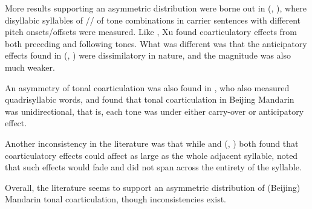 \documentclass[12pt]{report}
\newcommand{\tip}{\textipa}
\begin{document}
\begin{CJK}{UTF8}{bsmi}
More results supporting an asymmetric distribution were borne out in \citeauthor{Xu1994a} (\citeyear{Xu1994a}, \citeyear{Xu1997}), where disyllabic syllables of /\tip{ma.ma}/ of tone combinations in carrier sentences with different pitch onsets/offsets were measured. Like \cite{Shen1990}, Xu found coarticulatory effects from both preceding and following tones. What was different was that the anticipatory effects found in \citeauthor{Xu1994a} (\citeyear{Xu1994a}, \citeyear{Xu1997}) were dissimilatory in nature, and the magnitude was also much weaker.

An asymmetry of tonal coarticulation was also found in \cite{LinYan1991}, who also measured quadrisyllabic words, and found that tonal coarticulation in Beijing Mandarin was unidirectional, that is, each tone was under either carry-over or anticipatory effect.

Another inconsistency in the literature was that while \cite{Shen1990} and \citeauthor{Xu1994a} (\citeyear{Xu1994a}, \citeyear{Xu1997}) both found that coarticulatory effects could affect as large as the whole adjacent syllable, \cite{LinYan1991} noted that such effects would fade and did not span across the entirety of the syllable.

Overall, the literature seems to support an asymmetric distribution of (Beijing) Mandarin tonal coarticulation, though inconsistencies exist.


\end{CJK}
\end{document}
